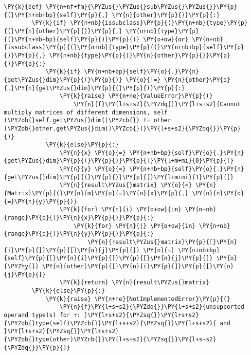 \begin{Verbatim}[commandchars=\\\{\}]
    \PY{k}{def} \PY{n+nf+fm}{\PYZus{}\PYZus{}sub\PYZus{}\PYZus{}}\PY{p}{(}\PY{n+nb+bp}{self}\PY{p}{,} \PY{n}{other}\PY{p}{)}\PY{p}{:}
        \PY{k}{if} \PY{n+nb}{issubclass}\PY{p}{(}\PY{n+nb}{type}\PY{p}{(}\PY{n}{other}\PY{p}{)}\PY{p}{,} \PY{n+nb}{type}\PY{p}{(}\PY{n+nb+bp}{self}\PY{p}{)}\PY{p}{)} \PY{o+ow}{or} \PY{n+nb}{issubclass}\PY{p}{(}\PY{n+nb}{type}\PY{p}{(}\PY{n+nb+bp}{self}\PY{p}{)}\PY{p}{,} \PY{n+nb}{type}\PY{p}{(}\PY{n}{other}\PY{p}{)}\PY{p}{)}\PY{p}{:}
            \PY{k}{if} \PY{n+nb+bp}{self}\PY{o}{.}\PY{n}{get\PYZus{}dim}\PY{p}{(}\PY{p}{)} \PY{o}{!=} \PY{n}{other}\PY{o}{.}\PY{n}{get\PYZus{}dim}\PY{p}{(}\PY{p}{)}\PY{p}{:}
                \PY{k}{raise} \PY{n+ne}{ValueError}\PY{p}{(}
                    \PY{n}{f}\PY{l+s+s2}{\PYZdq{}}\PY{l+s+s2}{Cannot multiply matrices of different dimensions, self (\PYZob{}self.get\PYZus{}dim()\PYZcb{}) != other (\PYZob{}other.get\PYZus{}dim()\PYZcb{})}\PY{l+s+s2}{\PYZdq{}}\PY{p}{)}
            \PY{k}{else}\PY{p}{:}
                \PY{n}{x} \PY{o}{=} \PY{n+nb+bp}{self}\PY{o}{.}\PY{n}{get\PYZus{}dim}\PY{p}{(}\PY{p}{)}\PY{p}{[}\PY{l+m+mi}{0}\PY{p}{]}
                \PY{n}{y} \PY{o}{=} \PY{n+nb+bp}{self}\PY{o}{.}\PY{n}{get\PYZus{}dim}\PY{p}{(}\PY{p}{)}\PY{p}{[}\PY{l+m+mi}{1}\PY{p}{]}
                \PY{n}{result\PYZus{}matrix} \PY{o}{=} \PY{n}{Matrix}\PY{p}{(}\PY{n}{m}\PY{o}{=}\PY{n}{x}\PY{p}{,} \PY{n}{n}\PY{o}{=}\PY{n}{y}\PY{p}{)}
                \PY{k}{for} \PY{n}{i} \PY{o+ow}{in} \PY{n+nb}{range}\PY{p}{(}\PY{n}{x}\PY{p}{)}\PY{p}{:}
                    \PY{k}{for} \PY{n}{j} \PY{o+ow}{in} \PY{n+nb}{range}\PY{p}{(}\PY{n}{y}\PY{p}{)}\PY{p}{:}
                        \PY{n}{result\PYZus{}matrix}\PY{p}{[}\PY{n}{i}\PY{p}{]}\PY{p}{[}\PY{n}{j}\PY{p}{]} \PY{o}{=} \PY{n+nb+bp}{self}\PY{p}{[}\PY{n}{i}\PY{p}{]}\PY{p}{[}\PY{n}{j}\PY{p}{]} \PY{o}{\PYZhy{}} \PY{n}{other}\PY{p}{[}\PY{n}{i}\PY{p}{]}\PY{p}{[}\PY{n}{j}\PY{p}{]}
                \PY{k}{return} \PY{n}{result\PYZus{}matrix}
        \PY{k}{else}\PY{p}{:}
            \PY{k}{raise} \PY{n+ne}{NotImplementedError}\PY{p}{(}
                \PY{n}{f}\PY{l+s+s2}{\PYZdq{}}\PY{l+s+s2}{unsupported operand type(s) for +: }\PY{l+s+s2}{\PYZsq{}}\PY{l+s+s2}{\PYZob{}type(self)\PYZcb{}}\PY{l+s+s2}{\PYZsq{}}\PY{l+s+s2}{ and }\PY{l+s+s2}{\PYZsq{}}\PY{l+s+s2}{\PYZob{}type(other)\PYZcb{}}\PY{l+s+s2}{\PYZsq{}}\PY{l+s+s2}{\PYZdq{}}\PY{p}{)}


\end{Verbatim}
